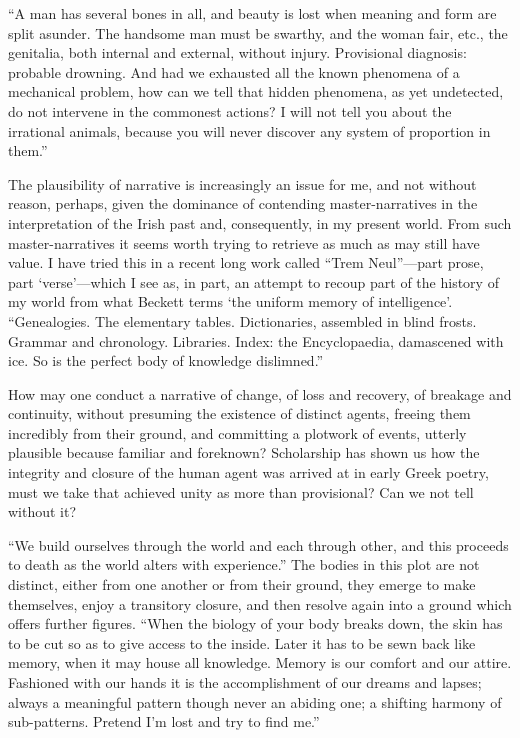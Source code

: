 \documentclass[
]{memoir}
\begin{document}
``A man has several bones in all, and beauty is lost when meaning and
form are split asunder. The handsome man must be swarthy, and the woman
fair, etc., the genitalia, both internal and external, without injury.
Provisional diagnosis: probable drowning. And had we exhausted all the
known phenomena of a mechanical problem, how can we tell that hidden
phenomena, as yet undetected, do not intervene in the commonest actions?
I will not tell you about the irrational animals, because you will never
discover any system of proportion in them.''

The plausibility of narrative is increasingly an issue for me, and not
without reason, perhaps, given the dominance of contending
master-narratives in the interpretation of the Irish past and,
consequently, in my present world. From such master-narratives it seems
worth trying to retrieve as much as may still have value. I have tried
this in a recent long work called ``Trem Neul''---part prose, part
`verse'---which I see as, in part, an attempt to recoup part of the
history of my world from what Beckett terms `the uniform memory of
intelligence'. ``Genealogies. The elementary tables. Dictionaries,
assembled in blind frosts. Grammar and chronology. Libraries. Index: the
Encyclopaedia, damascened with ice. So is the perfect body of knowledge
dislimned.''

How may one conduct a narrative of change, of loss and recovery, of
breakage and continuity, without presuming the existence of distinct
agents, freeing them incredibly from their ground, and committing a
plotwork of events, utterly plausible because familiar and foreknown?
Scholarship has shown us how the integrity and closure of the human
agent was arrived at in early Greek poetry, must we take that achieved
unity as more than provisional? Can we not tell without it?

``We build ourselves through the world and each through other, and this
proceeds to death as the world alters with experience.'' The bodies in
this plot are not distinct, either from one another or from their
ground, they emerge to make themselves, enjoy a transitory closure, and
then resolve again into a ground which offers further figures. ``When
the biology of your body breaks down, the skin has to be cut so as to
give access to the inside. Later it has to be sewn back like memory,
when it may house all knowledge. Memory is our comfort and our attire.
Fashioned with our hands it is the accomplishment of our dreams and
lapses; always a meaningful pattern though never an abiding one; a
shifting harmony of sub-patterns. Pretend I'm lost and try to find me.''
\end{document}
